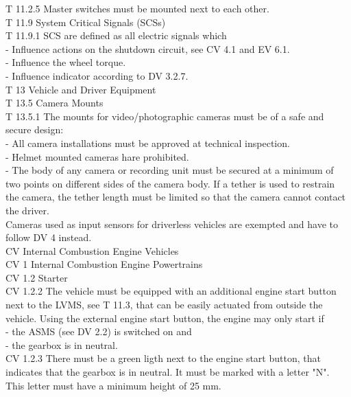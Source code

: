 \documentclass{article}
\begin{document}
T 11.2.5 Master switches must be mounted next to each other.\\

T 11.9 System Critical Signals (SCSs)\\

T 11.9.1 SCS are defined as all electric signals which\\
	- Influence actions on the shutdown circuit, see CV 4.1 and EV 6.1.\\
	- Influence the wheel torque.\\
	- Influence indicator according to DV 3.2.7.\\

T 13 Vehicle and Driver Equipment\\

T 13.5 Camera Mounts\\

T 13.5.1 The mounts for video/photographic cameras must be of a safe and secure design:\\
	- All camera installations must be approved at technical inspection.\\
	- Helmet mounted cameras hare prohibited.\\
	- The body of any camera or recording unit must be secured at a minimum of two points on different sides of the camera body. If a tether is used to restrain the camera, the tether length must be limited so that the camera cannot contact the driver.\\
	Cameras used as input sensors for driverless vehicles are exempted and have to follow DV 4 instead.\\

CV Internal Combustion Engine Vehicles\\

CV 1 Internal Combustion Engine Powertrains\\

CV 1.2 Starter\\

CV 1.2.2 The vehicle must be equipped with an additional engine start button next to the LVMS, see T 11.3, that can be easily actuated from outside the vehicle. Using the external engine start button, the engine may only start if\\
	- the ASMS (see DV 2.2) is switched on and\\
	- the gearbox is in neutral.\\
	
CV 1.2.3 There must be a green ligth next to the engine start button, that indicates that the gearbox is in neutral. It must be marked with a letter "N". This letter must have a minimum height of 25 mm.\\
\end{document}
